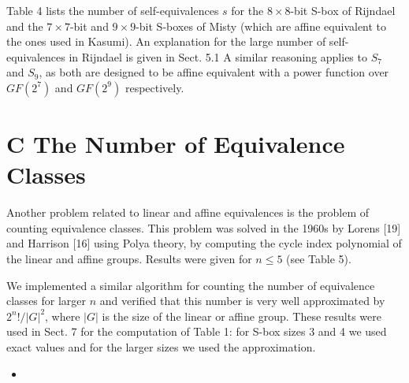 \documentclass[10pt]{article}
\begin{document}
Table 4 lists the number of self-equivalences $s$ for the $8 \times 8$-bit S-box of Rijndael and the $7 \times 7$-bit and $9 \times 9$-bit S-boxes of Misty (which are affine equivalent to the ones used in Kasumi). An explanation for the large number of self-equivalences in Rijndael is given in Sect. 5.1 A similar reasoning applies to $S_{7}$ and $S_{9}$, as both are designed to be affine equivalent with a power function over $G F\left(2^{7}\right)$ and $G F\left(2^{9}\right)$ respectively.

\section*{C The Number of Equivalence Classes}
Another problem related to linear and affine equivalences is the problem of counting equivalence classes. This problem was solved in the 1960s by Lorens [19] and Harrison [16] using Polya theory, by computing the cycle index polynomial of the linear and affine groups. Results were given for $n \leq 5$ (see Table 5).

We implemented a similar algorithm for counting the number of equivalence classes for larger $n$ and verified that this number is very well approximated by $2^{n}!/|G|^{2}$, where $|G|$ is the size of the linear or affine group. These results were used in Sect. 7 for the computation of Table 1: for S-box sizes 3 and 4 we used exact values and for the larger sizes we used the approximation.

\begin{itemize}
  \item 
\end{itemize}
\end{document}
